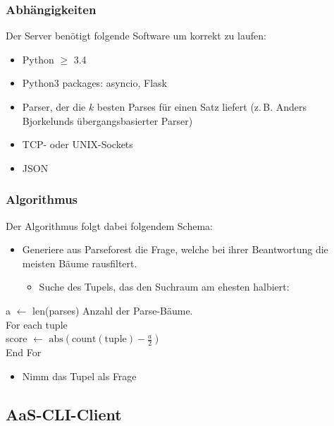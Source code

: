 \documentclass{scrartcl}
\begin{document}
\subsubsection{Abhängigkeiten}
\label{ssub:Server-Abhaengigkeiten}
Der Server benötigt folgende Software um korrekt zu laufen:
    \begin{itemize}
        \item Python $\geq$ 3.4 
        \item Python3 packages: asyncio, Flask
        \item Parser, der die $k$ besten Parses für einen Satz liefert (z.\,B. Anders Bjorkelunds übergangsbasierter Parser)
        \item TCP- oder UNIX-Sockets
        \item JSON
    \end{itemize}

\subsubsection{Algorithmus}
\label{ssub:Algorithmus}

Der Algorithmus folgt dabei folgendem Schema:
    \begin{itemize}
        \item Generiere aus Parseforest die Frage, welche bei ihrer Beantwortung die meisten Bäume rausfiltert.
            \begin{itemize}
                \item Suche des Tupels, das den Suchraum am ehesten halbiert:
            \end{itemize}
    \end{itemize}

        \indent\indent\indent\indent\indent\indent a $\gets$ len(parses) Anzahl der Parse-Bäume. \\
        \indent\indent\indent\indent\indent\indent For each tuple \\
       \indent\indent\indent\indent\indent\indent\indent score $\gets$ $\mathrm{abs}(\mathrm{count(tuple)} - \frac{a}{2})$ \\
        \indent\indent\indent\indent\indent\indent End For

    \begin{itemize}
        \item Nimm das Tupel als Frage
    \end{itemize}

\subsection{AaS-CLI-Client}
\label{sub:AaS-CLI-Client}
\end{document}
